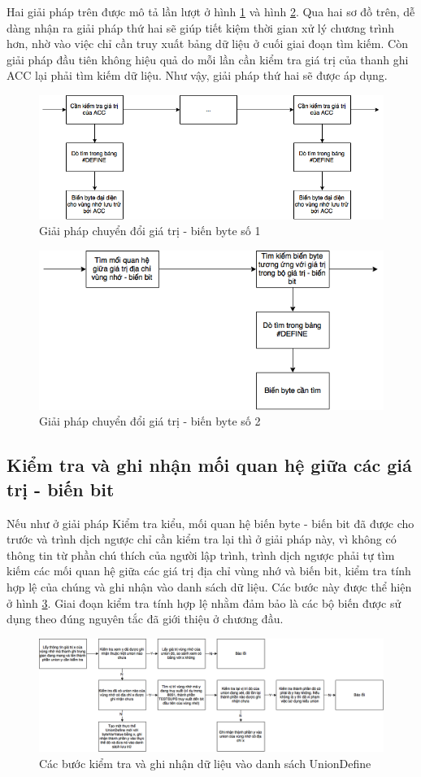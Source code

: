 Hai giải pháp trên được mô tả lần lượt ở hình \ref{fig:waytotransfer1} và hình \ref{fig:waytotransfer2}. Qua hai sơ đồ trên, dễ dàng nhận ra giải pháp thứ hai sẽ giúp tiết kiệm thời gian xử lý chương trình hơn, nhờ vào việc chỉ cần truy xuất bảng dữ liệu ở cuối giai đoạn tìm kiếm. Còn giải pháp đầu tiên không hiệu quả do mỗi lần cần kiểm tra giá trị của thanh ghi ACC lại phải tìm kiếm dữ liệu. Như vậy, giải pháp thứ hai sẽ được áp dụng.
\begin{figure}
	\centering
	\includegraphics[width=0.7\linewidth]{image/wayToTransfer1}
	\caption{Giải pháp chuyển đổi giá trị - biến byte số 1}
	\label{fig:waytotransfer1}
\end{figure}
\begin{figure}
	\centering
	\includegraphics[width=0.7\linewidth]{image/wayToTransfer2}
	\caption{Giải pháp chuyển đổi giá trị - biến byte số 2}
	\label{fig:waytotransfer2}
\end{figure}
\subsection{Kiểm tra và ghi nhận mối quan hệ giữa các giá trị - biến bit}
 Nếu như ở giải pháp Kiểm tra kiểu, mối quan hệ biến byte - biến bit đã được cho trước và trình dịch ngược chỉ cần kiểm tra lại thì ở giải pháp này, vì không có thông tin từ phần chú thích của người lập trình, trình dịch ngược phải tự tìm kiếm các mối quan hệ giữa các giá trị địa chỉ vùng nhớ và biến bit, kiểm tra tính hợp lệ của chúng và ghi nhận vào danh sách dữ liệu. Các bước này được thể hiện ở hình \ref{fig:stepunionmaking}. Giai đoạn kiểm tra tính hợp lệ nhằm đảm bảo là các bộ biến được sử dụng theo đúng nguyên tắc đã giới thiệu ở chương đầu.
\begin{figure}[h]
	\centering
	\includegraphics[width=0.7\linewidth]{image/stepUnionMaking}
	\caption{Các bước kiểm tra và ghi nhận dữ liệu vào danh sách UnionDefine}
	\label{fig:stepunionmaking}
\end{figure}

